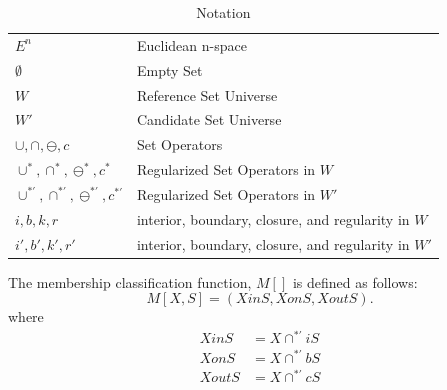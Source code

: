 \documentclass[a4paper,11pt,oneside]{article}
\begin{document}
\begin{table}
	\caption{Notation}
	\label{table:notations}
	\begin{tabularx}{\textwidth}{p{}X}
		\toprule
		$E^n$                                        & Euclidean n-space                                   \\
		$\emptyset$                                  & Empty Set                                           \\
		$W$                                          & Reference Set Universe                              \\
		$W'$                                         & Candidate Set Universe                              \\
		$\cup, \cap, \ominus, c$                     & Set Operators                                       \\
		$\cup^*, \cap^*, \ominus^*, c^*$             & Regularized Set Operators in $W$                    \\
		$\cup^{*'}, \cap^{*'}, \ominus^{*'}, c^{*'}$ & Regularized Set Operators in $W'$                   \\
		$i, b, k, r$                                 & interior, boundary, closure, and regularity in $W$  \\
		$i', b', k', r'$                             & interior, boundary, closure, and regularity in $W'$ \\
		\bottomrule
	\end{tabularx}
\end{table}

\begin{definition}
	The membership classification function, $M[]$ is defined as follows:
	\begin{equation}
		M[X, S] = (XinS, XonS, XoutS).
	\end{equation}
	where
	\begin{align*}
		XinS  & = X \cap^{*'} iS \\
		XonS  & = X \cap^{*'} bS \\
		XoutS & = X \cap^{*'} cS 
	\end{align*}
\end{definition}
\end{document}
